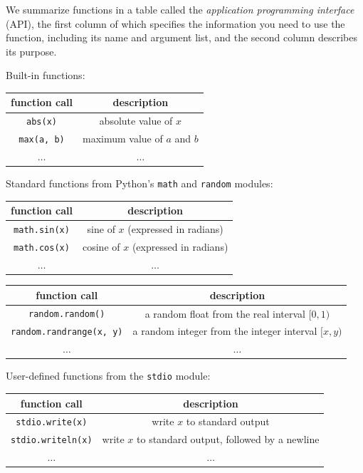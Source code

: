 \documentclass[8pt,a4paper,compress,handout]{beamer}
\begin{document}
\begin{frame}[fragile]
We summarize functions in a table called the \emph{application programming interface} (API), the first column of which specifies the information you need to use the function, including its name and argument list, and the second column describes its purpose.

\smallskip

Built-in functions:

\begin{center}
\begin{tabular}{cc}
function call & description \\ \hline
\lstinline$abs(x)$ & absolute value of $x$ \\
\lstinline$max(a, b)$ & maximum value of $a$ and $b$ \\
$\dots$ & $\dots$
\end{tabular} 
\end{center}

\smallskip

Standard functions from Python's \lstinline{math} and \lstinline{random} modules:

\begin{center}
\begin{tabular}{cc}
function call & description \\ \hline
\lstinline$math.sin(x)$ & sine of $x$ (expressed in radians) \\
\lstinline$math.cos(x)$ & cosine of $x$ (expressed in radians) \\
$\dots$ & $\dots$
\end{tabular} 

\begin{tabular}{cc}
function call & description \\ \hline
\lstinline$random.random()$ & a random float from the real interval $[0, 1)$ \\
\lstinline$random.randrange(x, y)$ & a random integer from the integer interval $[x, y)$ \\
$\dots$ & $\dots$
\end{tabular} 
\end{center}

\smallskip

User-defined functions from the \lstinline{stdio} module:

\begin{center}
\begin{tabular}{cc}
function call & description \\ \hline
\lstinline$stdio.write(x)$ & write $x$ to standard output \\
\lstinline$stdio.writeln(x)$ & write $x$ to standard output, followed by a newline \\
$\dots$ & $\dots$
\end{tabular} 
\end{center}
\end{frame}
\end{document}
